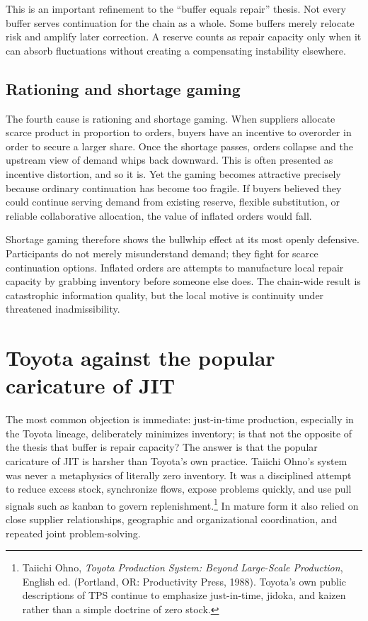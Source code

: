 \documentclass[11pt]{article}
\begin{document}
This is an important refinement to the ``buffer equals repair'' thesis. Not every buffer serves continuation for the chain as a whole. Some buffers merely relocate risk and amplify later correction. A reserve counts as repair capacity only when it can absorb fluctuations without creating a compensating instability elsewhere.

\subsection*{Rationing and shortage gaming}
The fourth cause is rationing and shortage gaming. When suppliers allocate scarce product in proportion to orders, buyers have an incentive to overorder in order to secure a larger share. Once the shortage passes, orders collapse and the upstream view of demand whips back downward. This is often presented as incentive distortion, and so it is. Yet the gaming becomes attractive precisely because ordinary continuation has become too fragile. If buyers believed they could continue serving demand from existing reserve, flexible substitution, or reliable collaborative allocation, the value of inflated orders would fall.

Shortage gaming therefore shows the bullwhip effect at its most openly defensive. Participants do not merely misunderstand demand; they fight for scarce continuation options. Inflated orders are attempts to manufacture local repair capacity by grabbing inventory before someone else does. The chain-wide result is catastrophic information quality, but the local motive is continuity under threatened inadmissibility.

\section{Toyota against the popular caricature of JIT}
The most common objection is immediate: just-in-time production, especially in the Toyota lineage, deliberately minimizes inventory; is that not the opposite of the thesis that buffer is repair capacity? The answer is that the popular caricature of JIT is harsher than Toyota's own practice. Taiichi Ohno's system was never a metaphysics of literally zero inventory. It was a disciplined attempt to reduce excess stock, synchronize flows, expose problems quickly, and use pull signals such as kanban to govern replenishment.\footnote{Taiichi Ohno, \emph{Toyota Production System: Beyond Large-Scale Production}, English ed. (Portland, OR: Productivity Press, 1988). Toyota's own public descriptions of TPS continue to emphasize just-in-time, jidoka, and kaizen rather than a simple doctrine of zero stock.} In mature form it also relied on close supplier relationships, geographic and organizational coordination, and repeated joint problem-solving.
\end{document}
